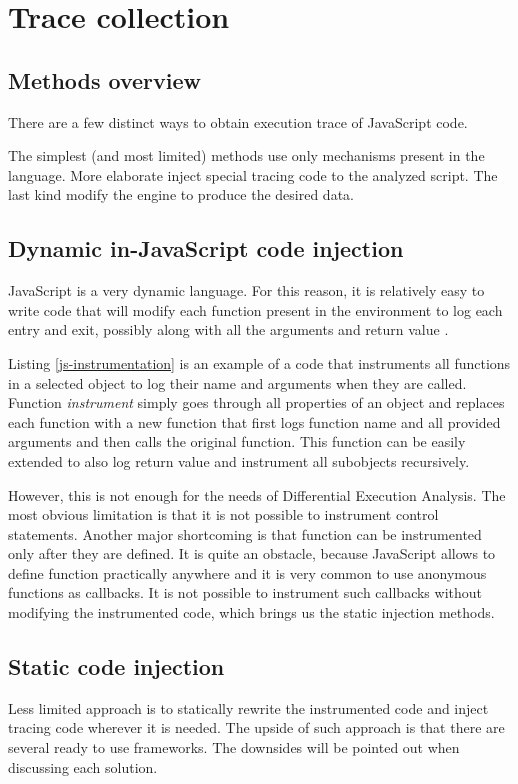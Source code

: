 \chapter{Trace collection}

\section{Methods overview}
There are a few distinct ways to obtain execution trace of JavaScript code. 

The simplest (and most limited) methods use only mechanisms present in the language.
More elaborate inject special tracing code to the analyzed script. The last kind modify the engine to produce
the desired data.

\section{Dynamic in-JavaScript code injection}
JavaScript is a very dynamic language. For this reason, it is relatively easy to write code that will
modify each function present in the environment to log each entry and exit,
possibly along with all the arguments and return value \cite{stack:js-console-log}.

Listing \ref{js-instrumentation} is an example of a code that instruments all functions in a selected object
to log their name and arguments when they are called.
Function \emph{instrument} simply goes through all properties of an object and 
replaces each function with a new function that first logs function
name and all provided arguments and then calls the original function.
This function can be easily extended to also log return value and instrument all subobjects recursively.

However, this is not enough for the needs of Differential Execution Analysis. 
The most obvious limitation is that it is not possible to instrument control statements.
Another major shortcoming is that function can be instrumented only after they are defined. 
It is quite an obstacle, because JavaScript allows to define function practically anywhere and it is very common
to use anonymous functions as callbacks. It is not possible to instrument such callbacks 
without modifying the instrumented code, which brings us the static injection methods.



\section{Static code injection}
Less limited approach is to statically rewrite the instrumented code and inject tracing code wherever it is needed.
The upside of such approach is that there are several ready to use frameworks.
The downsides will be pointed out when discussing each solution.

